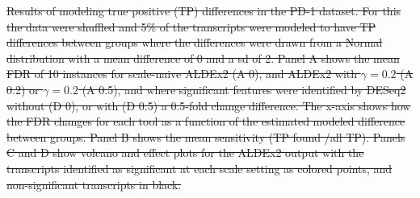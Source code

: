 \documentclass[
]{article}
\providecommand{\DIFdel}[1]{{\protect\color{red}\sout{#1}}}                      %
\providecommand{\DIFdelFL}[1]{\DIFdel{#1}} %
\begin{document}
{%
\DIFdelFL{Results of modeling true positive (TP) differences in the PD-1 dataset. For this the data were shuffled and  5\% of the transcripts were modeled to have TP differences between groups where the differences were drawn from a Normal distribution with a mean difference of 0 and a sd of 2. Panel A shows the mean FDR of 10 instances for scale-naive ALDEx2 (A 0), and ALDEx2 with \(\gamma=0.2\) (A 0.2) or \(\gamma=0.2\) (A 0.5), and where significant features were identified by  DESeq2 without (D 0), or with (D 0.5) a 0.5-fold change difference. The x-axis shows how the FDR changes for each tool as a function of the estimated modeled difference between groups. Panel B shows the mean sensitivity (TP found /all TP). Panels C and D show volcano and effect plots for the ALDEx2 output with the transcripts identified as significant at each scale setting as colored points, and non-significant transcripts in black.}}%
\end{document}
